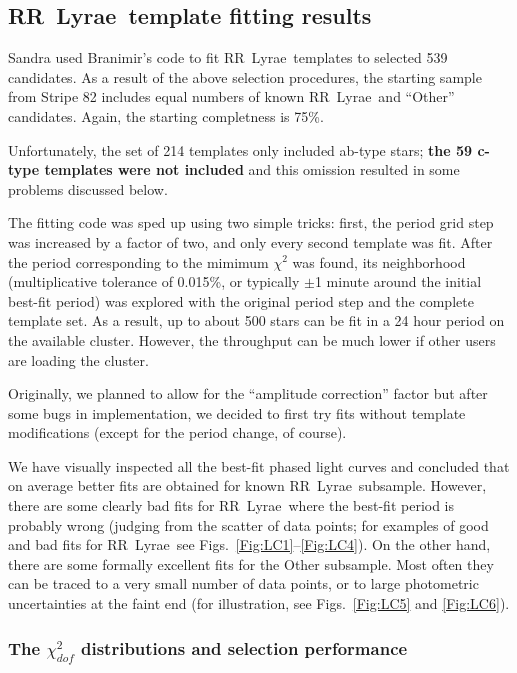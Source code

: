 \documentclass[12pt, preprint]{aastex}
\def\RR  {\hbox{RR Lyrae}}
\begin{document}
\subsection{\RR\  template fitting results} 

Sandra used Branimir's code to fit \RR\ templates to selected 539 candidates. As a result of the above 
selection procedures, the starting sample from Stripe 82 includes equal numbers of known \RR\ and
``Other'' candidates. Again, the starting completness is 75\%. 

Unfortunately, the set of 214 templates only included ab-type stars; {\bf the 59 c-type templates
were not included} and this omission resulted in some problems discussed below. 

The fitting code was sped up using two simple tricks: first, the period grid step was increased by a 
factor of two, and only every second template was fit. After the period corresponding to the mimimum
$\chi^2$ was found, its neighborhood (multiplicative tolerance of 0.015\%, or typically $\pm$1
minute around the initial best-fit period) was explored with the original period step and the
complete template set. As a result, up to about 500 stars can be fit in a 24 hour period on the 
available cluster. However, the throughput can be much lower if other users are loading
the cluster. 

Originally, we planned to allow for the ``amplitude correction'' factor but after some 
bugs in implementation, we decided to first try fits without template modifications (except for the period
change, of course). 

We have visually inspected all the best-fit phased light curves and concluded that on
average better fits are obtained for known \RR\ subsample. However, there are 
some clearly bad fits for \RR\  where the best-fit period is probably wrong (judging from
the scatter of data points; for examples of good and bad fits for \RR\ see 
Figs.~\ref{Fig:LC1}--\ref{Fig:LC4}). On the other hand, there are some formally 
excellent fits for the Other subsample. Most often they can be traced to a very small 
number of data points, or to large photometric uncertainties at the faint end (for
illustration, see Figs.~\ref{Fig:LC5} and \ref{Fig:LC6}).



\subsubsection{The $\chi^2_{dof}$ distributions and selection performance} 
\end{document}
